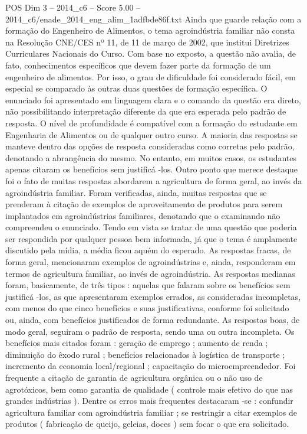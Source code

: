 \begin{textsample}{POS Dim 3 – 2014\_c6 – Score 5.00 – 2014\_c6/enade\_2014\_eng\_alim\_1adfbde86f.txt}
Ainda que guarde relação com a formação do Engenheiro de Alimentos, o tema agroindústria familiar não consta na Resolução CNE/CES nº 11, de 11 de março de 2002, que institui Diretrizes Curriculares Nacionais do Curso.
Com base no exposto, a questão não avalia, de fato, conhecimentos específicos que devem fazer parte da formação de um engenheiro de alimentos.
Por isso, o grau de dificuldade foi considerado fácil, em especial se comparado às outras duas questões de formação específica.
O enunciado foi apresentado em linguagem clara e o comando da questão era direto, não possibilitando interpretação diferente da que era esperada pelo padrão de resposta.
O nível de profundidade é compatível com a formação do estudante em Engenharia de Alimentos ou de qualquer outro curso.
A maioria das respostas se manteve dentro das opções de resposta consideradas como corretas pelo padrão, denotando a abrangência do mesmo.
No entanto, em muitos casos, os estudantes apenas citaram os benefícios sem justificá -los.
Outro ponto que merece destaque foi o fato de muitas respostas abordarem a agricultura de forma geral, ao invés da agroindústria familiar.
Foram verificadas, ainda, muitas respostas que se prenderam à citação de exemplos de aproveitamento de produtos para serem implantados em agroindústrias familiares, denotando que o examinando não compreendeu o enunciado.
Tendo em vista se tratar de uma questão que poderia ser respondida por qualquer pessoa bem informada, já que o tema é amplamente discutido pela mídia, a média ficou aquém do esperado.
As respostas fracas, de forma geral, mencionaram exemplos de agroindústrias e, ainda, responderam em termos de agricultura familiar, ao invés de agroindústria.
As respostas medianas foram, basicamente, de três tipos : aquelas que falaram sobre os benefícios sem justificá -los, as que apresentaram exemplos errados, as consideradas incompletas, com menos do que cinco benefícios e suas justificativas, conforme foi solicitado ou, ainda, com benefícios justificados de forma redundante.
As respostas boas, de modo geral, seguiram o padrão de resposta, sendo uma ou outra incompleta.
Os benefícios mais citados foram : geração de emprego ; aumento de renda ; diminuição do êxodo rural ; benefícios relacionados à logística de transporte ; incremento da economia local/regional ; capacitação do microempreendedor.
Foi frequente a citação de garantia de agricultura orgânica ou o não uso de agrotóxicos, bem como garantia de qualidade ( controle mais efetivo do que nas grandes indústrias ).
Dentre os erros mais frequentes destacaram -se : confundir agricultura familiar com agroindústria familiar ; se restringir a citar exemplos de produtos ( fabricação de queijo, geleias, doces ) sem focar o que era solicitado.

\end{textsample}
